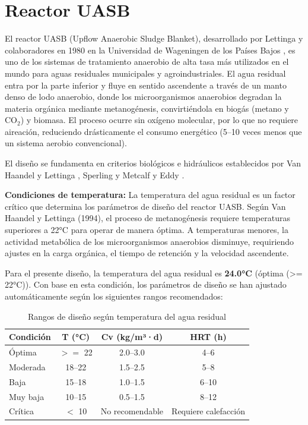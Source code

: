\documentclass[12pt,a4paper]{article}
\begin{document}
\section{Reactor UASB}



El reactor UASB (Upflow Anaerobic Sludge Blanket), desarrollado por Lettinga y colaboradores en 1980 en la Universidad de Wageningen de los Países Bajos \cite{vanhaandel1994}, es uno de los sistemas de tratamiento anaerobio de alta tasa más utilizados en el mundo para aguas residuales municipales y agroindustriales. El agua residual entra por la parte inferior y fluye en sentido ascendente a través de un manto denso de lodo anaerobio, donde los microorganismos anaerobios degradan la materia orgánica mediante metanogénesis, convirtiéndola en biogás (metano y CO$_2$) y biomasa. El proceso ocurre sin oxígeno molecular, por lo que no requiere aireación, reduciendo drásticamente el consumo energético (5--10 veces menos que un sistema aerobio convencional).

El diseño se fundamenta en criterios biológicos e hidráulicos establecidos por Van Haandel y Lettinga \cite{vanhaandel1994}, Sperling \cite{sperling2007} y Metcalf y Eddy \cite{metcalf2014}.

\textbf{Condiciones de temperatura:} La temperatura del agua residual es un factor crítico que determina los parámetros de diseño del reactor UASB. Según Van Haandel y Lettinga (1994), el proceso de metanogénesis requiere temperaturas superiores a 22°C para operar de manera óptima. A temperaturas menores, la actividad metabólica de los microorganismos anaerobios disminuye, requiriendo ajustes en la carga orgánica, el tiempo de retención y la velocidad ascendente.

Para el presente diseño, la temperatura del agua residual es \textbf{24.0°C} (óptima (>= 22°C)). Con base en esta condición, los parámetros de diseño se han ajustado automáticamente según los siguientes rangos recomendados:

\begin{table}[H]
\centering
\caption{Rangos de diseño según temperatura del agua residual}
\small
\begin{tabular}{lccc}
\toprule
\textbf{Condición} & \textbf{T (°C)} & \textbf{Cv (kg/m³·d)} & \textbf{HRT (h)} \\
\midrule
Óptima & $>=$ 22 & 2.0--3.0 & 4--6 \\
Moderada & 18--22 & 1.5--2.5 & 5--8 \\
Baja & 15--18 & 1.0--1.5 & 6--10 \\
Muy baja & 10--15 & 0.5--1.5 & 8--12 \\
Crítica & $<$ 10 & No recomendable & Requiere calefacción \\
\bottomrule
\end{tabular}
\end{table}
\end{document}

